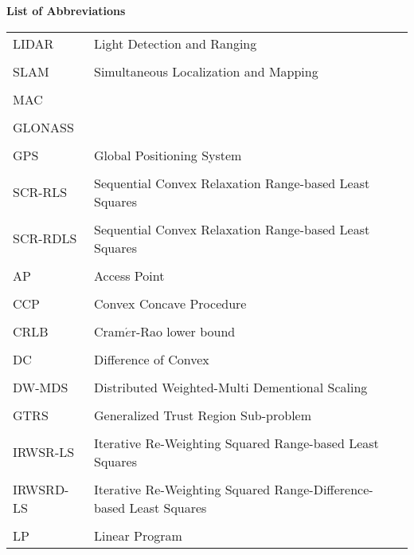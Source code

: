 \newpage


\phantom{m}

\begin{flushleft}
\begin{Huge}
\textbf{List of Abbreviations}
\end{Huge}
\end{flushleft}

\phantom{m}

\begin{longtable}[h]{l l}
LIDAR & Light Detection and Ranging\\
\\
SLAM & Simultaneous Localization and Mapping  \\
\\
MAC & \\
\\
GLONASS & \\
\\
GPS & Global Positioning System \\
\\
SCR-RLS & Sequential Convex Relaxation Range-based Least Squares \\
\\
SCR-RDLS & Sequential Convex Relaxation Range-based Least Squares\\
\\
AP & Access Point \\
\\
CCP & Convex Concave Procedure \\
\\
CRLB & Cram$\acute{e}$r-Rao  lower  bound \\
\\
DC & Difference of Convex \\
\\
DW-MDS & Distributed Weighted-Multi Dementional Scaling \\
\\
GTRS & Generalized Trust Region Sub-problem \\
\\
IRWSR-LS & Iterative Re-Weighting Squared Range-based Least Squares \\
\\
IRWSRD-LS & Iterative Re-Weighting Squared Range-Difference-based Least Squares\\
\\
LP & Linear Program \\

\end{longtable}
